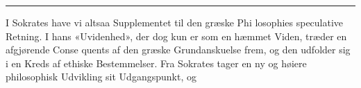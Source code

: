\documentclass[12pt,a4paper]{book}
\newcommand{\divrule}{\begin{center}\rule{2cm}{0.4pt}\end{center}}
\begin{document}
\divrule

I Sokrates have vi altsaa Supplementet til den græske Phi\-%
losophies speculative Retning. I hans «Uvidenhed», der dog
kun er som en hæmmet Viden, træder en afgjørende Conse\-%
quents af den græske Grundanskuelse frem, og den udfolder
sig i en Kreds af ethiske Bestemmelser. Fra Sokrates tager
en ny og høiere philosophisk Udvikling sit Udgangspunkt, og
\end{document}

